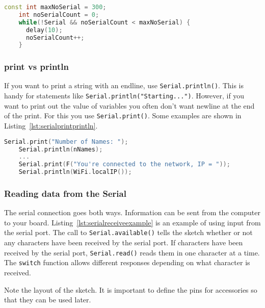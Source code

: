 \begin{lstlisting}[language=C++, caption={This snippet tries connecting to Serial a fixed 
    number of times so that it will delay less than Listing~\ref{lst:serialstartdelay} if 
    a serial connection exists.},label={lst:serialstartcount}]
    const int maxNoSerial = 300;
    int noSerialCount = 0;
    while(!Serial && noSerialCount < maxNoSerial) {
      delay(10);
      noSerialCount++;
    }
\end{lstlisting}

\subsubsection{print vs println}
If you want to print a string with an endline, use \lstinline$Serial.println()$. This is 
handy for statements like \lstinline$Serial.println("Starting...")$. However, if you 
want to print out the value of variables you often don't want newline at the end of
the print. For this you use \lstinline$Serial.print()$. Some examples are shown in 
Listing~\ref{lst:serialprintprintln}.
\begin{lstlisting}[language=C++, caption={This snippet shows using print and println},label={lst:serialprintprintln}]
    Serial.print("Number of Names: ");
    Serial.println(nNames);
    ...
    Serial.print(F("You're connected to the network, IP = "));
    Serial.println(WiFi.localIP());    
\end{lstlisting}

\subsubsection{Reading data from the Serial}
The serial connection goes both ways. Information can be sent from the computer to 
your board. Listing~\ref{lst:serialreceiveexample} is an example of using input from 
the serial port. The call to \lstinline$Serial.available()$ tells the sketch whether
or not any characters have been received by the serial port. If characters have been
received by the serial port, \lstinline$Serial.read()$ reads them in one character at 
a time. The \lstinline$switch$ function allows different responses depending on what 
character is received. 

Note the layout of the sketch. It is important to define the pins for accessories so 
that they can be used later. 

